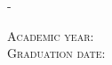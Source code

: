 \begin{titlingpage}
{\begin{adjustwidth}{\unitlength}{-\unitlength}
\begin{center}
				\vspace{2cm}
				\large{\textsc{Academic year:} \quad \AcademicYear}\\
				\large{\textsc{Graduation date:} \quad \GraduationDate}
			\end{center}
		\end{adjustwidth}
	}
\end{titlingpage}

